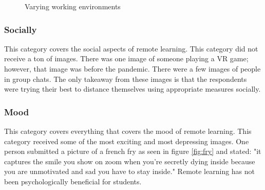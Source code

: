 \documentclass[12pt,
 reprint,
nofootinbib,
 amsmath,amssymb,
 aps,
floatfix,
]{revtex4-2}
\begin{document}
\begin{figure}[h!]
    \centering
    \qquad
    \caption{Varying working environments}%
    \label{fig:desks}%
\end{figure}

\subsubsection{Socially}

This category covers the social aspects of remote learning. This category did not receive a ton of images. There was one image of someone playing a VR game; however, that image was before the pandemic. There were a few images of people in group chats. The only takeaway from these images is that the respondents were trying their best to distance themselves using appropriate measures socially. 

\subsubsection{Mood}

This category covers everything that covers the mood of remote learning. This category received some of the most exciting and most depressing images. One person submitted a picture of a french fry as seen in figure \ref{fig:fry} and stated: "it captures the smile you show on zoom when you're secretly dying inside because you are unmotivated and sad you have to stay inside." Remote learning has not been psychologically beneficial for students. 
\end{document}
